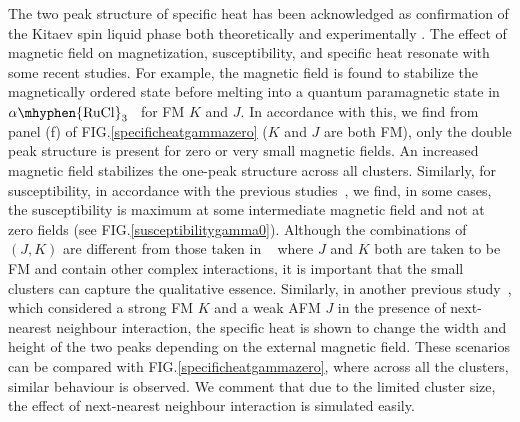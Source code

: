 \documentclass[aps,amsmath,twocolumn,amssymb,floatfix,showpacs,superscriptaddress,nofootinbib,longbibliography]{revtex4-1}
\begin{document}
\indent
The two peak structure of specific heat has been acknowledged as confirmation of the Kitaev spin liquid phase both theoretically and experimentally \cite{kataoka-jpsj-2020,andrade-2020,tathagata-2020,bachus-2021,balz-prb-2021,feng-2020,yogesh-2017,nasu-2015,yamaji-2016}. The effect of magnetic field on magnetization, susceptibility, and specific heat resonate with some recent studies. For example, the magnetic field is found to stabilize the magnetically ordered state before melting into a quantum paramagnetic state in $\alpha\mhyphen{\rm RuCl}_3$~\cite{balz-prb-2021} for FM $K$ and $J$. In accordance with this, we find from panel (f) of FIG.\ref{specificheatgammazero} ($K$ and $J$ are both FM), only the double peak structure is present for zero or very small magnetic fields. An increased magnetic field stabilizes the one-peak structure across all clusters. Similarly, for susceptibility, in accordance with the previous studies~\cite{andrade-2020}, we find, in some cases, the susceptibility is maximum at some intermediate magnetic field and not at zero fields (see FIG.\ref{susceptibilitygamma0}). Although the combinations of $\left(J, K\right)$ are different from those taken in ~\cite{andrade-2020} where $J$ and $K$ both are taken to be FM and contain other complex interactions, it is important that the small clusters can capture the qualitative essence\cite{kataoka-jpsj-2020}. Similarly, in another previous study~\cite{yamaji-2016}, which considered a strong FM $K$ and a weak AFM $J$ in the presence of next-nearest neighbour interaction, the specific heat is shown to change the width and height of the two peaks depending on the external magnetic field. These scenarios can be compared with FIG.\ref{specificheatgammazero}, where across all the clusters, similar behaviour is observed. We comment that due to the limited cluster size, the effect of next-nearest neighbour interaction is simulated easily.
\end{document}
